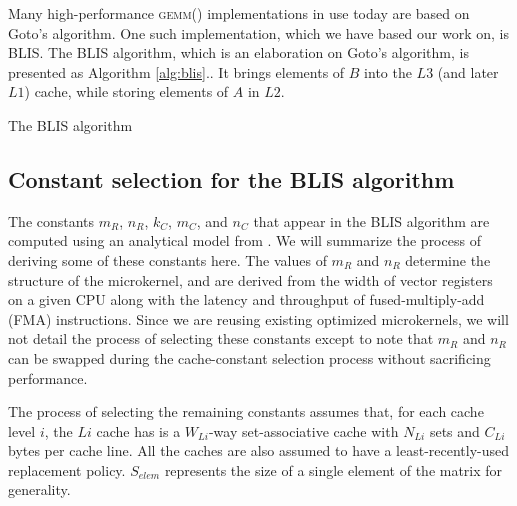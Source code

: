 \documentclass[12pt]{article}
\newcommand*{\TO}{\textbf{to}}
\newcommand*{\gemm}{{\textsc{gemm()}}}
\begin{document}
Many high-performance \gemm{} implementations in use today are based on Goto's algorithm\cite{Goto2008}.
One such implementation, which we have based our work on, is BLIS\cite{VanZee2016}.
The BLIS algorithm, which is an elaboration on Goto's algorithm, is presented as Algorithm \ref{alg:blis}..
It brings elements of $B$ into the $L3$ (and later $L1$) cache, while storing elements of $A$ in $L2$.
\begin{algorithm}
  \caption{The BLIS algorithm}
  \label{alg:blis}
  \begin{tikzpicture}
    
  \end{tikzpicture}
  \begin{algorithmic}
    \For{$j \gets 0, n_C, \ldots$ \TO{} $n$}
    \For{$p \gets 0, k_C, \ldots$ \TO{} $k$}
    \For{$i \gets 0, m_C, \ldots$ \TO{} $m$}
    \EndFor{}
    \EndFor{}
    \EndFor{}
    \EndProcedure{}
  \end{algorithmic}
\end{algorithm}

\subsection{Constant selection for the BLIS algorithm}\label{subsec:constants}
The constants $m_R$, $n_R$, $k_C$, $m_C$, and $n_C$ that appear in the BLIS algorithm are computed using an analytical model from \cite{Low2016}.
We will summarize the process of deriving some of these constants here.
The values of $m_R$ and $n_R$ determine the structure of the microkernel, and are derived from the width of vector registers on a given CPU along with the latency and throughput of fused-multiply-add (FMA) instructions.
Since we are reusing existing optimized microkernels, we will not detail the process of selecting these constants except to note that $m_R$ and $n_R$ can be swapped during the cache-constant selection process without sacrificing performance.

The process of selecting the remaining constants assumes that, for each cache level $i$, the $Li$ cache has is a $W_{Li}$-way set-associative cache with $N_{Li}$ sets and $C_{Li}$ bytes per cache line.
All the caches are also assumed to have a least-recently-used replacement policy.
$S_{elem}$ represents the size of a single element of the matrix for generality.
\end{document}
